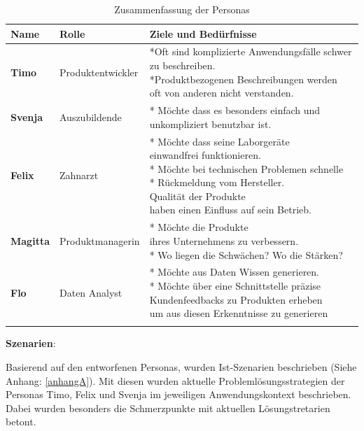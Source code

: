 \begin{table}[htbp]
	\caption{Zusammenfassung der Personas}
		\begin{tabular}{|l|l|l|}
			\hline
			 \textbf{Name} & \textbf{Rolle}& \textbf{Ziele und Bedürfnisse}\\
			\hline
			\textbf{Timo} &  Produktentwickler & \makecell[l]{*Oft sind komplizierte Anwendungsfälle schwer zu beschreiben.\\ *Produktbezogenen Beschreibungen werden\\ oft von anderen nicht verstanden.} \\
			\hline
			\textbf{Svenja} & Auszubildende & * Möchte dass es besonders einfach und unkompliziert benutzbar ist.\\
			\hline
			\textbf{Felix} & Zahnarzt &  \makecell[l]{* Möchte dass seine Laborgeräte \\einwandfrei funktionieren.\\ * Möchte bei technischen Problemen schnelle\\ * Rückmeldung vom Hersteller. \\Qualität der Produkte\\ haben einen Einfluss auf sein Betrieb.} \\
			\hline
			\textbf{Magitta} & Produktmanagerin & \makecell[l]{* Möchte die Produkte\\ ihres Unternehmens zu verbessern.\\ * Wo liegen die Schwächen? Wo die Stärken?}\\
			\hline
			\textbf{Flo} & Daten Analyst & \makecell[l]{* Möchte aus Daten Wissen generieren.\\ * Möchte über eine Schnittstelle präzise\\ Kundenfeedbacks zu Produkten erheben\\ um aus diesen Erkenntnisse zu generieren} \\\\
			\hline
		\end{tabular}
	\label{tab:personas}
\end{table}

\textbf{Szenarien}:

Basierend auf den entworfenen Personas, wurden Ist-Szenarien beschrieben (Siehe Anhang: \ref{anhangA}). Mit diesen wurden aktuelle Problemlösungsstrategien der Personas Timo, Felix und Svenja im jeweiligen 
Anwendungskontext beschrieben. Dabei wurden besonders die Schmerzpunkte mit aktuellen Lösungstretarien betont. 


